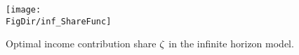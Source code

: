 \hypertarget{inf_ShareFunc}{}
\begin{figure}[tbp]
\centerline{\texttt{[image: \\FigDir/inf\_ShareFunc]}}
\caption{Optimal income contribution share $\zeta$ in the infinite horizon model.}
\label{fig:inf_ShareFunc}
\end{figure}